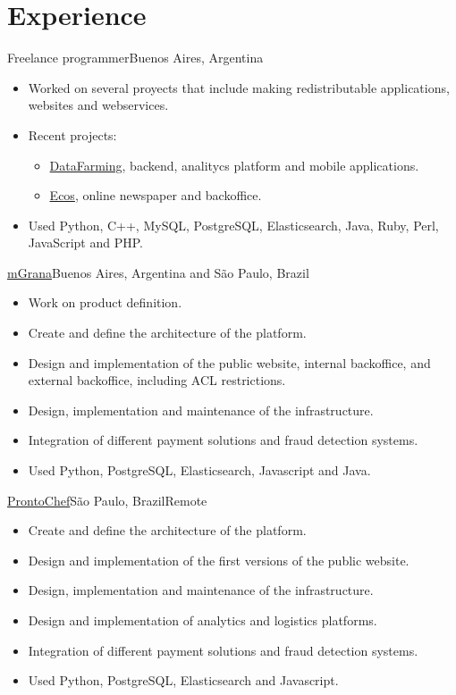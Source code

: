 \documentclass[a4paper,11pt]{moderncv}
\newcommand\weblink[2] {{\color{href} \href{#1}{#2}}}
\begin{document}
\pagebreak

\section{Experience}
{Freelance programmer}{Buenos Aires, Argentina}{}{%
\begin{itemize}
  \item Worked on several proyects that include making redistributable
  applications, websites and webservices.
  \item Recent projects:
  \begin{itemize}
    \item \weblink{http://www.datafarming.net}{DataFarming}, backend,
      analitycs platform and mobile applications.
    \item \weblink{http://www.ecos.la}{Ecos}, online newspaper and
      backoffice.
  \end{itemize}
  \item Used Python, C++, MySQL, PostgreSQL, Elasticsearch, Java, Ruby,
    Perl, JavaScript and PHP.
\end{itemize}
}
%
{\weblink{https://mgrana.com}{mGrana}}{Buenos Aires, Argentina and São Paulo, Brazil}{}{%
\begin{itemize}
  \item Work on product definition.
  \item Create and define the architecture of the platform.
  \item Design and implementation of the public website, internal backoffice, and external backoffice, including ACL restrictions.
  \item Design, implementation and maintenance of the infrastructure.
  \item Integration of different payment solutions and fraud detection 
    systems.
  \item Used Python, PostgreSQL, Elasticsearch, Javascript and Java.
\end{itemize}
}
%
{\weblink{https://www.prontochef.com.br}{ProntoChef}}{São Paulo, Brazil}{Remote}{%
\begin{itemize}
  \item Create and define the architecture of the platform.
  \item Design and implementation of the first versions of the public website.
  \item Design, implementation and maintenance of the infrastructure.
  \item Design and implementation of analytics and logistics platforms.
  \item Integration of different payment solutions and fraud detection 
    systems.
  \item Used Python, PostgreSQL, Elasticsearch and Javascript.
\end{itemize}
}
\end{document}
